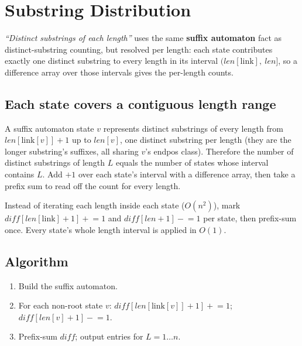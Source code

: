 \section{Substring Distribution}
\label{sec:cses-substring-distribution}


\begin{patternbox}
\emph{``Distinct substrings of each length''} uses the same
\textbf{suffix automaton} fact as distinct-substring counting, but resolved
per length: each state contributes exactly one distinct substring to every
length in its interval
$(\textit{len}[\text{link}],\ \textit{len}]$, so a difference array over
those intervals gives the per-length counts.
\end{patternbox}

\subsection*{Each state covers a contiguous length range}

A suffix automaton state $v$ represents distinct substrings of every length
from $\textit{len}[\text{link}[v]]+1$ up to $\textit{len}[v]$, one distinct
substring per length (they are the longer substring's suffixes, all sharing
$v$'s endpos class). Therefore the number of distinct substrings of length
$L$ equals the number of states whose interval contains $L$. Add $+1$ over
each state's interval with a difference array, then take a prefix sum to
read off the count for every length.

\begin{ideabox}
Instead of iterating each length inside each state ($O(n^2)$), mark
$\textit{diff}[\textit{len}[\text{link}]+1]\mathrel{+}{=}1$ and
$\textit{diff}[\textit{len}+1]\mathrel{-}{=}1$ per state, then prefix-sum
once. Every state's whole length interval is applied in $O(1)$.
\end{ideabox}

\subsection*{Algorithm}

\begin{enumerate}
  \item Build the suffix automaton.
  \item For each non-root state $v$: $\textit{diff}[\textit{len}[
        \text{link}[v]]+1]\mathrel{+}{=}1$;
        $\textit{diff}[\textit{len}[v]+1]\mathrel{-}{=}1$.
  \item Prefix-sum $\textit{diff}$; output entries for $L=1\ldots n$.
\end{enumerate}

